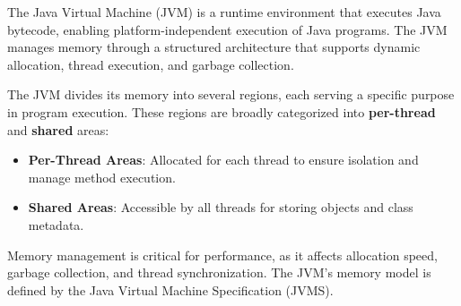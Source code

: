 \documentclass{article}
\begin{document}
The Java Virtual Machine (JVM) is a runtime environment that executes Java bytecode, enabling platform-independent execution of Java programs. The JVM manages memory through a structured architecture that supports dynamic allocation, thread execution, and garbage collection.


The JVM divides its memory into several regions, each serving a specific purpose in program execution. These regions are broadly categorized into \textbf{per-thread} and \textbf{shared} areas:
\begin{itemize}
	\item \textbf{Per-Thread Areas}: Allocated for each thread to ensure isolation and manage method execution.
	\item \textbf{Shared Areas}: Accessible by all threads for storing objects and class metadata.
\end{itemize}
Memory management is critical for performance, as it affects allocation speed, garbage collection, and thread synchronization. The JVM's memory model is defined by the Java Virtual Machine Specification (JVMS).
\end{document}
